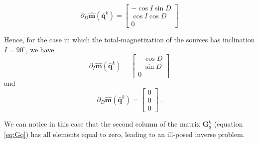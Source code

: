 \begin{equation}
\partial_{D} \hat{\mathbf{m}}(\bar{\mathbf{q}}^{k}) = 
\begin{bmatrix}
	-\cos I \sin D \\
	 \cos I \cos D\\
	 0
\end{bmatrix}
\label{eq:D_mag_vec_dec}
\end{equation}


Hence, for the case in which the total-magnetization of the sources has inclination $I = 90^\circ$, we have 
\begin{equation*}
\partial_{I} \hat{\mathbf{m}}(\bar{\mathbf{q}}^{k}) = 
\begin{bmatrix}
	-\cos D \\
	-\sin D\\
	 0
\end{bmatrix}
\label{eq:D_mag_vec_inc_I90}
\end{equation*}
and
\begin{equation*}
\partial_{D} \hat{\mathbf{m}}(\bar{\mathbf{q}}^{k}) = 
\begin{bmatrix}
	0 \\
	0 \\
	0
\end{bmatrix} \: .
\label{eq:D_mag_vec_dec_I90}
\end{equation*}

We can notice in this case that the second column of the matrix $\mathbf{G}_{q}^{k}$ (equation \ref{eq:Gq}) 
has all elements equal to zero, leading to an ill-posed inverse problem.         



